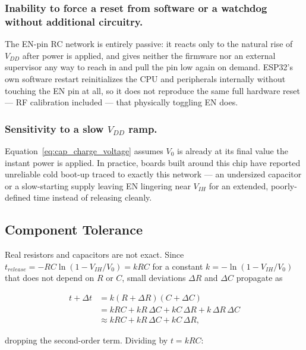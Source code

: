 \documentclass[conference]{IEEEtran}
\begin{document}
\subsubsection{Inability to force a reset from software or a watchdog without additional circuitry.}

The EN-pin RC network is entirely passive: it reacts only to the natural rise of $V_{DD}$ after power is applied, and gives neither the firmware nor an external supervisor any way to reach in and pull the pin low again on demand. ESP32's own software restart reinitializes the CPU and peripherals internally without touching the EN pin at all, so it does not reproduce the same full hardware reset --- RF calibration included --- that physically toggling EN does.

\subsubsection{Sensitivity to a slow $V_{DD}$ ramp.}

Equation~\ref{eq:cap_charge_voltage} assumes $V_0$ is already at its final value the instant power is applied. In practice, boards built around this chip have reported unreliable cold boot-up traced to exactly this network --- an undersized capacitor or a slow-starting supply leaving EN lingering near $V_{IH}$ for an extended, poorly-defined time instead of releasing cleanly.


\subsection{Component Tolerance}

Real resistors and capacitors are not exact. Since $t_{release}=-RC\ln(1-V_{IH}/V_0)=kRC$ for a constant $k=-\ln(1-V_{IH}/V_0)$ that does not depend on $R$ or $C$, small deviations $\Delta R$ and $\Delta C$ propagate as
 
\begin{equation}
    \begin{align}
        t+\Delta t &= k(R+\Delta R)(C+\Delta C)\\
        &= kRC + kR\,\Delta C + kC\,\Delta R + k\,\Delta R\,\Delta C\\
        &\approx kRC + kR\,\Delta C + kC\,\Delta R,
    \end{align}
\end{equation}
 
\noindent
dropping the second-order term. Dividing by $t=kRC$:
 
\end{document}

